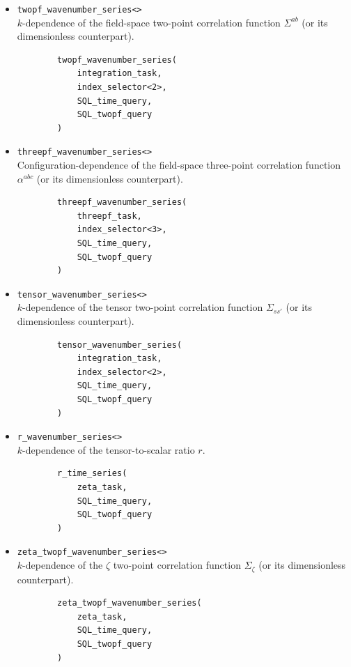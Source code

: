 \documentclass[11pt,a4paper]{article}
\begin{document}
\begin{itemize}
    \item \texttt{twopf_wavenumber_series<>} \\
    $k$-dependence of the field-space two-point correlation function $\Sigma^{ab}$
    (or its dimensionless counterpart).
    \begin{verbatim}
        twopf_wavenumber_series(
            integration_task,
            index_selector<2>,
            SQL_time_query,
            SQL_twopf_query
        )    
    \end{verbatim}
    
    \item \texttt{threepf_wavenumber_series<>} \\
    Configuration-dependence
    of the field-space three-point correlation function $\alpha^{abc}$
    (or its dimensionless counterpart).
    \begin{verbatim}
        threepf_wavenumber_series(
            threepf_task,
            index_selector<3>,
            SQL_time_query,
            SQL_twopf_query
        )    
    \end{verbatim}

    \item \texttt{tensor_wavenumber_series<>} \\
    $k$-dependence of the tensor
    two-point correlation function $\Sigma_{ss'}$
    (or its dimensionless counterpart).
    \begin{verbatim}
        tensor_wavenumber_series(
            integration_task,
            index_selector<2>,
            SQL_time_query,
            SQL_twopf_query
        )
    \end{verbatim}
    
    \item \texttt{r_wavenumber_series<>} \\
    $k$-dependence of the tensor-to-scalar ratio $r$.
    \begin{verbatim}
        r_time_series(
            zeta_task,
            SQL_time_query,
            SQL_twopf_query
        )
    \end{verbatim}

    \item \texttt{zeta_twopf_wavenumber_series<>} \\
    $k$-dependence of the $\zeta$ two-point correlation function $\Sigma_\zeta$
    (or its dimensionless counterpart).
    \begin{verbatim}
        zeta_twopf_wavenumber_series(
            zeta_task,
            SQL_time_query,
            SQL_twopf_query
        )
    \end{verbatim}


\end{itemize}
\end{document}
